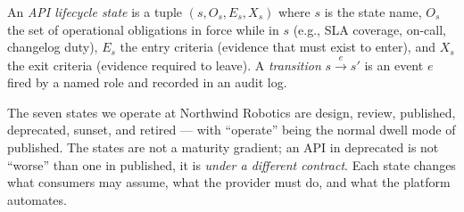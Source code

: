 \begin{definition}
An \emph{API lifecycle state} is a tuple $(s, O_s, E_s, X_s)$ where $s$ is
the state name, $O_s$ the set of operational obligations in force while in
$s$ (e.g., SLA coverage, on-call, changelog duty), $E_s$ the entry
criteria (evidence that must exist to enter), and $X_s$ the exit criteria
(evidence required to leave). A \emph{transition} $s \xrightarrow{e} s'$
is an event $e$ fired by a named role and recorded in an audit log.
\end{definition}

The seven states we operate at Northwind Robotics are
\textsf{design}, \textsf{review}, \textsf{published},
\textsf{deprecated}, \textsf{sunset}, and \textsf{retired} --- with
``operate'' being the normal dwell mode of \textsf{published}. The states
are not a maturity gradient; an API in \textsf{deprecated} is not
``worse'' than one in \textsf{published}, it is \emph{under a different
contract}. Each state changes what consumers may assume, what the provider
must do, and what the platform automates.

